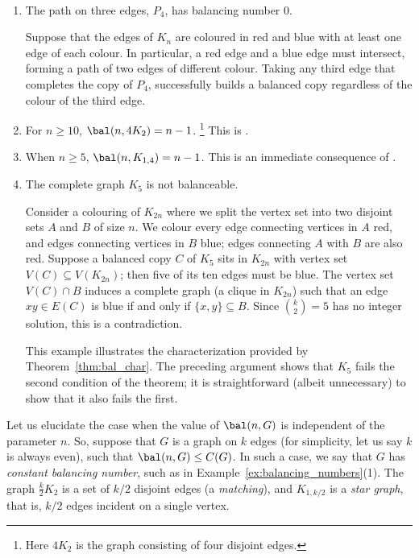 \begin{example}\label{ex:balancing_numbers}~ 
\begin{enumerate}
    \item The path on three edges, $P_4$, has balancing number $0$.
    
    Suppose that the edges of $K_n$ are coloured in red and blue with at least one edge of each colour.
    In particular, a red edge and a blue edge must intersect, forming a path of two edges of different colour.
    Taking any third edge that completes the copy of $P_4$, successfully builds a balanced copy regardless of the colour of the third edge.
    
    \item For $n\geq 10$, $\bal(n,4K_2)=n-1$.%
    \footnote{Here $4K_2$ is the graph consisting of four disjoint edges.}
    This is \cite[Theorem~2.3]{Caro_small_balanceable}.

    \item When $n\geq5$, $\bal(n,K_{1,4})=n-1$.
    This is an immediate consequence of \cite[Theorem~3.2]{unavoidable_chromatic}.

    \item The complete graph $K_5$ is not balanceable.
    
    Consider a colouring of $K_{2n}$ where we split the vertex set into two disjoint sets $A$ and $B$ of size $n$.
    We colour every edge connecting vertices in $A$ red, and edges connecting vertices in $B$ blue; edges connecting $A$ with $B$ are also red.
    Suppose a balanced copy $C$ of $K_5$ sits in $K_{2n}$ with vertex set $V(C)\subseteq V(K_{2n})$; then five of its ten edges must be blue.
    The vertex set $V(C)\cap B$ induces a complete graph (a clique in $K_{2n}$) such that an edge $xy\in E(C)$ is blue if and only if $\{x,y\}\subseteq B$.
    Since $\binom{k}{2}=5$ has no integer solution, this is a contradiction.
    
    This example illustrates the characterization provided by Theorem~\ref{thm:bal_char}.
    The preceding argument shows that $K_5$ fails the second condition of the theorem; it is straightforward (albeit unnecessary) to show that it also fails the first.
\end{enumerate}
\end{example}

Let us elucidate the case when the value of $\bal(n,G)$ is independent of the parameter $n$.
So, suppose that $G$ is a graph on $k$ edges (for simplicity, let us say $k$ is always even), such that $\bal(n,G)\leq C(G)$.
In such a case, we say that $G$ has \emph{constant balancing number}, such as in Example~\ref{ex:balancing_numbers}(1).
The graph $\frac k2K_2$ is a set of $k/2$ disjoint edges (a \emph{matching}), and $K_{1,k/2}$ is a \emph{star graph}, that is, $k/2$ edges incident on a single vertex.

